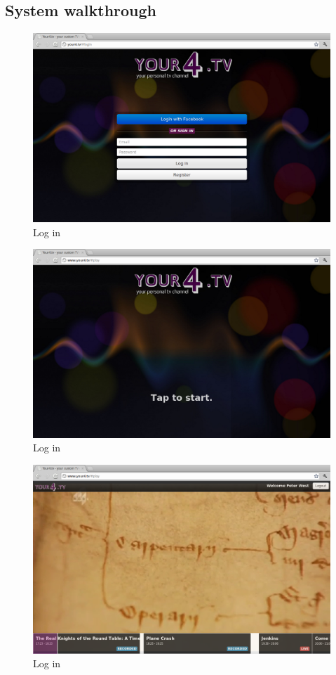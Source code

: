 \subsection{System walkthrough}
\begin{figure}[th]
	\centering
	\includegraphics[width=\textwidth]{images/screenshots/your4-login.png}
	\caption{Log in}
	\label{fig:your4-login}
\end{figure}
\begin{figure}[th]
	\centering
	\includegraphics[width=\textwidth]{images/screenshots/your4-tap-to-start.png}
	\caption{Log in}
	\label{fig:your4-tap-to-start}
\end{figure}
\begin{figure}[th]
	\centering
	\includegraphics[width=\textwidth]{images/screenshots/your4-play.png}
	\caption{Log in}
	\label{fig:your4-play}
\end{figure}

